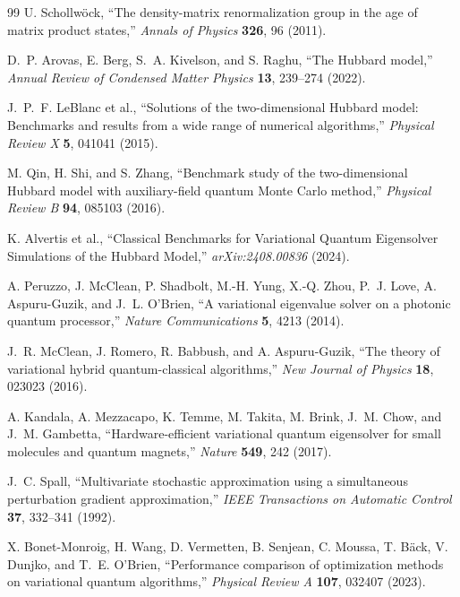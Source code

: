 \documentclass[
  reprint,
  amsmath,
  amssymb,
  aps,
  pra,
  nofootinbib,
  superscriptaddress,
  floatfix
]{revtex4-2}
\begin{document}
\begin{thebibliography}{99}
U. Schollw\"ock,
``The density-matrix renormalization group in the age of matrix product states,''
\emph{Annals of Physics} \textbf{326}, 96 (2011).

D.~P. Arovas, E. Berg, S.~A. Kivelson, and S. Raghu,
``The Hubbard model,''
\emph{Annual Review of Condensed Matter Physics} \textbf{13}, 239--274 (2022).

J.~P.~F. LeBlanc et al.,
``Solutions of the two-dimensional Hubbard model: Benchmarks and results from a wide range of numerical algorithms,''
\emph{Physical Review X} \textbf{5}, 041041 (2015).

M. Qin, H. Shi, and S. Zhang,
``Benchmark study of the two-dimensional Hubbard model with auxiliary-field quantum Monte Carlo method,''
\emph{Physical Review B} \textbf{94}, 085103 (2016).

K. Alvertis et al.,
``Classical Benchmarks for Variational Quantum Eigensolver Simulations of the Hubbard Model,''
\emph{arXiv:2408.00836} (2024).

A. Peruzzo, J. McClean, P. Shadbolt, M.-H. Yung, X.-Q. Zhou, P.~J. Love, A. Aspuru-Guzik, and J.~L. O'Brien,
``A variational eigenvalue solver on a photonic quantum processor,''
\emph{Nature Communications} \textbf{5}, 4213 (2014).

J.~R. McClean, J. Romero, R. Babbush, and A. Aspuru-Guzik,
``The theory of variational hybrid quantum-classical algorithms,''
\emph{New Journal of Physics} \textbf{18}, 023023 (2016).

A. Kandala, A. Mezzacapo, K. Temme, M. Takita, M. Brink, J.~M. Chow, and J.~M. Gambetta,
``Hardware-efficient variational quantum eigensolver for small molecules and quantum magnets,''
\emph{Nature} \textbf{549}, 242 (2017).

J.~C. Spall,
``Multivariate stochastic approximation using a simultaneous perturbation gradient approximation,''
\emph{IEEE Transactions on Automatic Control} \textbf{37}, 332--341 (1992).

X. Bonet-Monroig, H. Wang, D. Vermetten, B. Senjean, C. Moussa, T. B\"ack, V. Dunjko, and T.~E. O'Brien,
``Performance comparison of optimization methods on variational quantum algorithms,''
\emph{Physical Review A} \textbf{107}, 032407 (2023).


\end{thebibliography}
\end{document}
